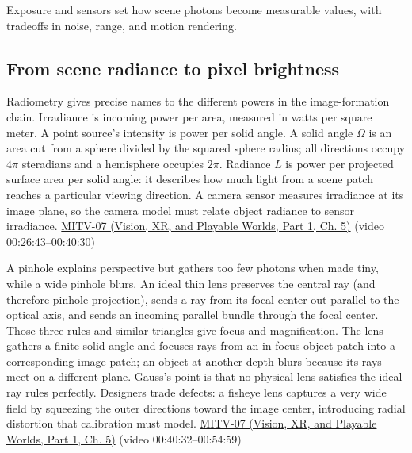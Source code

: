 \hypertarget{03-visual-computing-i-ch003-exposure-sensors-and-dynamic-range}{}

Exposure and sensors set how scene photons become measurable values, with tradeoffs in noise, range, and motion rendering.

\subsection{From scene radiance to pixel brightness}\label{03-visual-computing-i-ch003-from-scene-radiance-to-pixel-brightness}

\hypertarget{03-visual-computing-i-ch003-from-scene-radiance-to-pixel-brightness}{}

Radiometry gives precise names to the different powers in the image-formation chain. Irradiance is incoming power per area, measured in watts per square meter. A point source's intensity is power per solid angle. A solid angle \(\Omega\) is an area cut from a sphere divided by the squared sphere radius; all directions occupy \(4\pi\) steradians and a hemisphere occupies \(2\pi\). Radiance \(L\) is power per projected surface area per solid angle: it describes how much light from a scene patch reaches a particular viewing direction. A camera sensor measures irradiance at its image plane, so the camera model must relate object radiance to sensor irradiance. \href{../07-Vision-XR-and-Playable-Worlds-P01/main.pdf\#nameddest=04-visual-computing-ii-ch036-mitv-07---gradient-space-reflectance-map-image-irradiance-equation-gnomonic-projection}{MITV-07 (Vision, XR, and Playable Worlds, Part 1, Ch. 5)} (video 00:26:43--00:40:30)

A pinhole explains perspective but gathers too few photons when made tiny, while a wide pinhole blurs. An ideal thin lens preserves the central ray (and therefore pinhole projection), sends a ray from its focal center out parallel to the optical axis, and sends an incoming parallel bundle through the focal center. Those three rules and similar triangles give focus and magnification. The lens gathers a finite solid angle and focuses rays from an in-focus object patch into a corresponding image patch; an object at another depth blurs because its rays meet on a different plane. Gauss's point is that no physical lens satisfies the ideal ray rules perfectly. Designers trade defects: a fisheye lens captures a very wide field by squeezing the outer directions toward the image center, introducing radial distortion that calibration must model. \href{../07-Vision-XR-and-Playable-Worlds-P01/main.pdf\#nameddest=04-visual-computing-ii-ch036-mitv-07---gradient-space-reflectance-map-image-irradiance-equation-gnomonic-projection}{MITV-07 (Vision, XR, and Playable Worlds, Part 1, Ch. 5)} (video 00:40:32--00:54:59)

